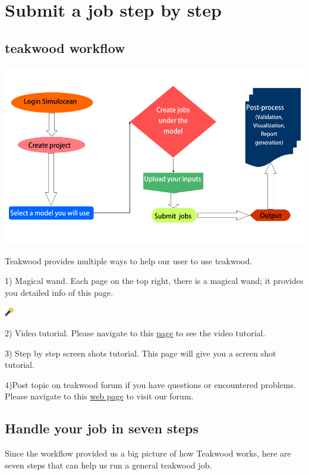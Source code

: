 \documentclass[letterpaper,10pt,openany, oneside]{sphinxmanual}
\begin{document}
\chapter{Submit a job step by step}
\label{demo:submit-a-job-step-by-step}\label{demo::doc}\label{demo:here}

\section{teakwood workflow}
\label{demo:teakwood-workflow}
{\hfill\includegraphics{jobworkflow.png}\hfill}

Teakwood provides multiple ways to help our user to use teakwood.

1) Magical wand.
Each page on the top right, there is a magical wand; it provides you detailed info of this page.

\includegraphics{magicalwand.png}

2) Video tutorial.
Please navigate to this \href{http://localhost:8000/about/contact/}{page} to see the video tutorial.

3) Step by step screen shots tutorial.
This page will give you a screen shot tutorial.

4)Post topic on teakwood forum if you have questions or encountered problems.
Please navigate to this \href{http://localhost:8000/about/contact/}{web page} to visit our forum.


\section{Handle your job in seven steps}
\label{demo:handle-your-job-in-seven-steps}
Since the workflow provided us a big picture of how Teakwood works, here are seven steps that can help us run
a general teakwood job.
\end{document}
